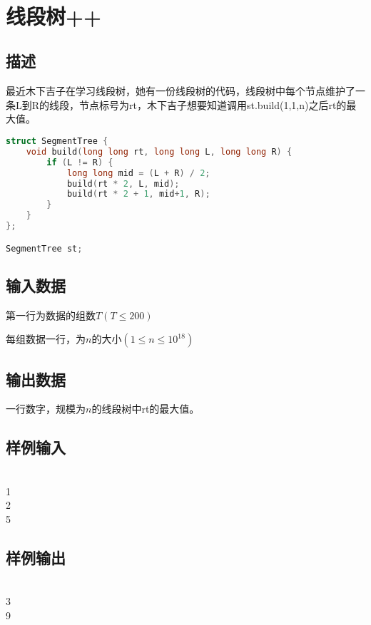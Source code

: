 \documentclass[UTF8]{ctexrep}
\begin{document}
\tt
{}
\fi


\section{线段树++}
\subsection*{描述}
最近木下吉子在学习线段树，她有一份线段树的代码，线段树中每个节点维护了一条L到R的线段，节点标号为rt，木下吉子想要知道调用st.build(1,1,n)之后rt的最大值。
\begin{lstlisting}[language=C++]
struct SegmentTree {
	void build(long long rt, long long L, long long R) {
		if (L != R) {
			long long mid = (L + R) / 2;
			build(rt * 2, L, mid);
			build(rt * 2 + 1, mid+1, R);
		}
	}
};

SegmentTree st;
\end{lstlisting} 

\subsection*{输入数据}
第一行为数据的组数$T(T\leqslant 200)$

每组数据一行，为$n$的大小$(1\leqslant n\leqslant 10^{18})$

\subsection*{输出数据}
一行数字，规模为$n$的线段树中rt的最大值。


\subsection*{样例输入}
\\
1\\
2\\
5


\subsection*{样例输出}
\\
3\\
9


\ifx\allfiles\undefined
\end{document}
